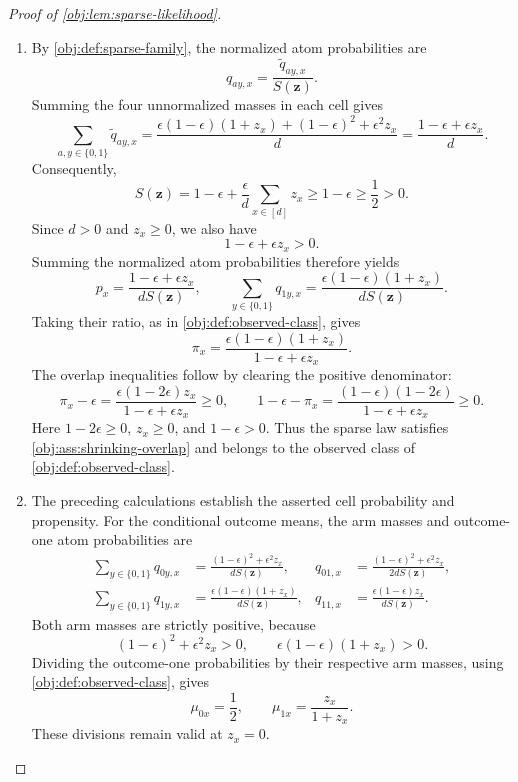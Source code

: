 \begin{proof}[Proof of \cref{obj:lem:sparse-likelihood}]
\begin{enumerate}
\item By \cref{obj:def:sparse-family}, the normalized atom probabilities are
\[
q_{ay,x}=\frac{\widetilde q_{ay,x}}{S(\mathbf z)}.
\]
Summing the four unnormalized masses in each cell gives
\[
\sum_{a,y\in\{0,1\}}\widetilde q_{ay,x}
=\frac{\epsilon(1-\epsilon)(1+z_x)+(1-\epsilon)^2+\epsilon^2z_x}{d}
=\frac{1-\epsilon+\epsilon z_x}{d}.
\]
Consequently,
\[
S(\mathbf z)
=1-\epsilon+\frac{\epsilon}{d}\sum_{x\in[d]}z_x
\ge 1-\epsilon\ge\frac12>0.
\]
Since \(d>0\) and \(z_x\ge0\), we also have
\[
1-\epsilon+\epsilon z_x>0.
\]
Summing the normalized atom probabilities therefore yields
\[
p_x=\frac{1-\epsilon+\epsilon z_x}{dS(\mathbf z)},
\qquad
\sum_{y\in\{0,1\}}q_{1y,x}
=\frac{\epsilon(1-\epsilon)(1+z_x)}{dS(\mathbf z)}.
\]
Taking their ratio, as in \cref{obj:def:observed-class}, gives
\[
\pi_x
=\frac{\epsilon(1-\epsilon)(1+z_x)}
{1-\epsilon+\epsilon z_x}.
\]
The overlap inequalities follow by clearing the positive denominator:
\[
\pi_x-\epsilon
=\frac{\epsilon(1-2\epsilon)z_x}{1-\epsilon+\epsilon z_x}\ge0,
\qquad
1-\epsilon-\pi_x
=\frac{(1-\epsilon)(1-2\epsilon)}
{1-\epsilon+\epsilon z_x}\ge0.
\]
Here \(1-2\epsilon\ge0\), \(z_x\ge0\), and \(1-\epsilon>0\).
Thus the sparse law satisfies \cref{obj:ass:shrinking-overlap} and belongs to the observed class of \cref{obj:def:observed-class}.

\item The preceding calculations establish the asserted cell probability and propensity. For the conditional outcome means, the arm masses and outcome-one atom probabilities are
\[
\begin{aligned}
\sum_{y\in\{0,1\}}q_{0y,x}
&=\frac{(1-\epsilon)^2+\epsilon^2z_x}{dS(\mathbf z)},
&
q_{01,x}
&=\frac{(1-\epsilon)^2+\epsilon^2z_x}{2dS(\mathbf z)},\\
\sum_{y\in\{0,1\}}q_{1y,x}
&=\frac{\epsilon(1-\epsilon)(1+z_x)}{dS(\mathbf z)},
&
q_{11,x}
&=\frac{\epsilon(1-\epsilon)z_x}{dS(\mathbf z)}.
\end{aligned}
\]
Both arm masses are strictly positive, because
\[
(1-\epsilon)^2+\epsilon^2z_x>0,
\qquad
\epsilon(1-\epsilon)(1+z_x)>0.
\]
Dividing the outcome-one probabilities by their respective arm masses, using \cref{obj:def:observed-class}, gives
\[
\mu_{0x}=\frac12,
\qquad
\mu_{1x}=\frac{z_x}{1+z_x}.
\]
These divisions remain valid at \(z_x=0\).


\end{enumerate}
\end{proof}
